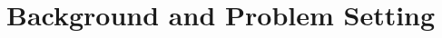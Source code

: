 \documentclass[letterpaper]{article} %
\newif\ifaddcomments
\newcommand{\roni}[1]{\ifaddcomments{\textcolor{red}{[Roni: #1]}}\fi}
\begin{document}





\section{Background and Problem Setting}

\end{document}
